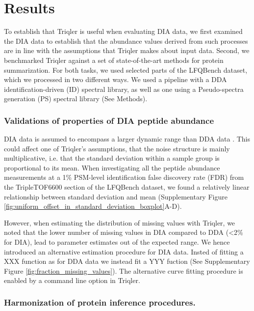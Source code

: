\documentclass[10pt,letterpaper]{article}
\begin{document}
\section*{Results}

To establish that Triqler is useful when evaluating DIA data, we first examined the DIA data to establish that the abundance values derived from such processes are in line with the assumptions that Triqler makes about input data. Second, we benchmarked Triqler against a set of state-of-the-art methods for protein summarization. For both tasks, we used selected parts of the LFQBench dataset, which we processed in two different ways. We used a pipeline with a DDA identification-driven (ID) spectral library, as well as one using a Pseudo-spectra generation (PS) spectral library (See Methods).


\subsubsection*{Validations of properties of DIA peptide abundance}

DIA data is assumed to encompass a larger dynamic range than DDA data . This could affect one of Triqler's assumptions, that the noise structure is mainly multiplicative, i.e. that the standard deviation within a sample group is proportional to its mean. When investigating all the peptide abundance measurements at a 1\% PSM-level identification false discovery rate (FDR) from the TripleTOF6600 section of the LFQBench dataset, we found a relatively linear relationship between standard deviation and mean (Supplementary Figure \ref{fig:uniform_offset_in_standard_deviation_boxplot}A-D). 

However, when estimating the distribution of missing values with Triqler, we noted that the lower number of missing values in DIA compared to DDA (<2\% for DIA), lead to parameter estimates out of the expected range. We hence introduced an alternative estimation procedure for DIA data. Insted of fitting a XXX function as for DDA data we instead fit a YYY fuction (See Supplementary Figure \ref{fig:fraction_missing_values}). The alternative curve fitting procedure is  enabled by a command line option in Triqler. 

\subsubsection*{Harmonization of protein inference procedures.}
\end{document}
